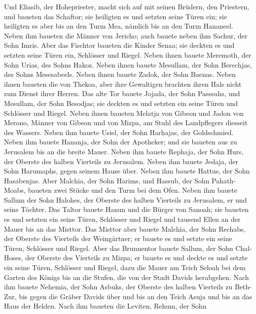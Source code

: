  Und Eliasib, der Hohepriester, macht sich auf mit seinen
Brüdern, den Priestern, und baueten das Schaftor; sie heiligten es und
setzten seine Türen ein; sie heiligten es aber bis an den Turm Mea,
nämlich bis an den Turm Hananeel.  Neben ihm baueten die
Männer von Jericho; auch bauete neben ihm Sachur, der Sohn Imris.
 Aber das Fischtor baueten die Kinder Senaa; sie deckten es
und setzten seine Türen ein, Schlösser und Riegel.  Neben
ihnen bauete Meremoth, der Sohn Urias, des Sohns Hakoz. Neben ihnen
bauete Mesullam, der Sohn Berechjas, des Sohns Mesesabeels. Neben ihnen
bauete Zadok, der Sohn Baenas.  Neben ihnen baueten die von
Thekoa, aber ihre Gewaltigen brachten ihren Hals nicht zum Dienst ihrer
Herren.  Das alte Tor bauete Jojada, der Sohn Passeahs, und
Mesullam, der Sohn Besodjas; sie deckten es und setzten ein seine Türen
und Schlösser und Riegel.  Neben ihnen baueten Melatja von
Gibeon und Jadon von Merono, Männer von Gibeon und von Mizpa, am Stuhl
des Landpflegers diesseit des Wassers.  Neben ihm bauete
Usiel, der Sohn Harhajas, der Goldschmied. Neben ihm bauete Hananja, der
Sohn der Apotheker; und sie baueten aus zu Jerusalem bis an die breite
Mauer.  Neben ihm bauete Rephaja, der Sohn Hurs, der Oberste
des halben Vierteils zu Jerusalem.  Neben ihm bauete
Jedaja, der Sohn Harumaphs, gegen seinem Hause über. Neben ihm bauete
Hattus, der Sohn Hasabenjas.  Aber Malchia, der Sohn
Harims, und Hassub, der Sohn Pahath-Moabs, baueten zwei Stücke und den
Turm bei dem Ofen.  Neben ihm bauete Sallum der Sohn
Halohes, der Oberste des halben Vierteils zu Jerusalem, er und seine
Töchter.  Das Taltor bauete Hanun und die Bürger von
Sanoah; sie baueten es und setzten ein seine Türen, Schlösser und Riegel
und tausend Ellen an der Mauer bis an das Misttor.  Das
Misttor aber bauete Malchia, der Sohn Rechabs, der Oberste des Vierteils
der Weingärtner; er bauete es und setzte ein seine Türen, Schlösser und
Riegel.  Aber das Brunnentor bauete Sallum, der Sohn
Chal-Hoses, der Oberste des Vierteils zu Mizpa; er bauete es und deckte
es und setzte ein seine Türen, Schlösser und Riegel, dazu die Mauer am
Teich Seloah bei dem Garten des Königs bis an die Stufen, die von der
Stadt Davids herabgehen.  Nach ihm bauete Nehemia, der Sohn
Asbuks, der Oberste des halben Vierteils zu Beth-Zur, bis gegen die
Gräber Davids über und bis an den Teich Asuja und bis an das Haus der
Helden.  Nach ihm baueten die Leviten, Rehum, der Sohn

